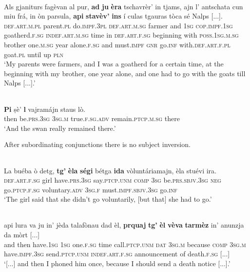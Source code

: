 \ea
\label{ex:aapi}
\\
\gll    Als gjaniturs fagèvan al pur, \textbf{ad} \textbf{ju} \textbf{èra} tschavrèr’ in tjams, ajn l’ antschata cun miu frá, in òn parsula, \textbf{api} \textbf{stavèv’} \textbf{ins} í culas tgauras tòca sé Nalps [...]. \\
\textsc{def.art.m.pl} parent.\textsc{pl} do.\textsc{impf.3pl} \textsc{def.art.m.sg} farmer and \textsc{1sg} \textsc{cop.impf.1sg} goatherd.\textsc{f.sg} \textsc{indef.art.m.sg} time in \textsc{def.art.f.sg} beginning with \textsc{poss.1sg.m.sg} brother one.\textsc{m.sg} year alone.\textsc{f.sg}  and  must.\textsc{impf} \textsc{gnr} go.\textsc{inf} with.\textsc{def.art.f.pl} goat.\textsc{pl} until up  \textsc{pln} \\
\glt `My parents were farmers, and I was a goatherd for a certain time, at the beginning with my brother, one year alone, and one had to go with the goats till Nalps [...].'
\z


\ea
\label{ex:aapi1}
\\
	\gll   \textbf{Pi} ṣè’ \textbf{l} vajramájn staus lò. \\
	then be.\textsc{prs.3sg} \textsc{3sg.m} true.\textsc{f.sg.adv} remain.\textsc{ptcp.m.sg} there\\
\glt `And the swan really remained there.'
\z



After subordinating conjunctions there is no subject inversion.

\ea
\label{}
 {\citealt[132]{Büchli1966}}\\
\gll    La buéba ò detg, \textbf{tg'} \textbf{èla} \textbf{ségi} bétga \textbf{ida} vòluntáriamajn, èla stuévi ira.\\
\textsc{def.art.f.sg} girl have.\textsc{prs.3sg} say.\textsc{ptcp.unm} \textsc{comp} \textsc{3sg} be.\textsc{prs.sbjv.3sg} \textsc{neg} go.\textsc{ptcp.f.sg} voluntary.\textsc{adv} \textsc{3sg.f} must.\textsc{impf.sbjv.3sg} go.\textsc{inf}\\
\glt `The girl said that she didn't go voluntarily, [but that] she had to go.'
\z

\ea
\label{}
\\
\gll  [...] api lura va ju in’ jèda talafònau dad èl, \textbf{prquaj} \textbf{tg'} \textbf{èl} \textbf{vèva} \textbf{tarmèz} in’ anunzja da mòrt [...]\\
{} and then have.\textsc{1sg}  \textsc{1sg} one.\textsc{f.sg} time call.\textsc{ptcp.unm} \textsc{dat} \textsc{3sg.m} because \textsc{comp} \textsc{3sg.m} have.\textsc{impf.3sg} send.\textsc{ptcp.unm} \textsc{indef.art.f.sg} announcement of death.\textsc{f.sg} [...]\\ 
\glt `[...] and then I phoned him once, because I should send a death notice [...].'
\z

